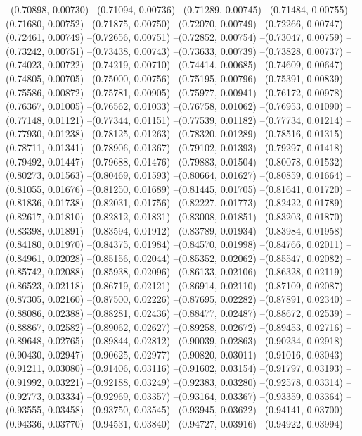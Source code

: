 --(0.70898, 0.00730)
--(0.71094, 0.00736)
--(0.71289, 0.00745)
--(0.71484, 0.00755)
--(0.71680, 0.00752)
--(0.71875, 0.00750)
--(0.72070, 0.00749)
--(0.72266, 0.00747)
--(0.72461, 0.00749)
--(0.72656, 0.00751)
--(0.72852, 0.00754)
--(0.73047, 0.00759)
--(0.73242, 0.00751)
--(0.73438, 0.00743)
--(0.73633, 0.00739)
--(0.73828, 0.00737)
--(0.74023, 0.00722)
--(0.74219, 0.00710)
--(0.74414, 0.00685)
--(0.74609, 0.00647)
--(0.74805, 0.00705)
--(0.75000, 0.00756)
--(0.75195, 0.00796)
--(0.75391, 0.00839)
--(0.75586, 0.00872)
--(0.75781, 0.00905)
--(0.75977, 0.00941)
--(0.76172, 0.00978)
--(0.76367, 0.01005)
--(0.76562, 0.01033)
--(0.76758, 0.01062)
--(0.76953, 0.01090)
--(0.77148, 0.01121)
--(0.77344, 0.01151)
--(0.77539, 0.01182)
--(0.77734, 0.01214)
--(0.77930, 0.01238)
--(0.78125, 0.01263)
--(0.78320, 0.01289)
--(0.78516, 0.01315)
--(0.78711, 0.01341)
--(0.78906, 0.01367)
--(0.79102, 0.01393)
--(0.79297, 0.01418)
--(0.79492, 0.01447)
--(0.79688, 0.01476)
--(0.79883, 0.01504)
--(0.80078, 0.01532)
--(0.80273, 0.01563)
--(0.80469, 0.01593)
--(0.80664, 0.01627)
--(0.80859, 0.01664)
--(0.81055, 0.01676)
--(0.81250, 0.01689)
--(0.81445, 0.01705)
--(0.81641, 0.01720)
--(0.81836, 0.01738)
--(0.82031, 0.01756)
--(0.82227, 0.01773)
--(0.82422, 0.01789)
--(0.82617, 0.01810)
--(0.82812, 0.01831)
--(0.83008, 0.01851)
--(0.83203, 0.01870)
--(0.83398, 0.01891)
--(0.83594, 0.01912)
--(0.83789, 0.01934)
--(0.83984, 0.01958)
--(0.84180, 0.01970)
--(0.84375, 0.01984)
--(0.84570, 0.01998)
--(0.84766, 0.02011)
--(0.84961, 0.02028)
--(0.85156, 0.02044)
--(0.85352, 0.02062)
--(0.85547, 0.02082)
--(0.85742, 0.02088)
--(0.85938, 0.02096)
--(0.86133, 0.02106)
--(0.86328, 0.02119)
--(0.86523, 0.02118)
--(0.86719, 0.02121)
--(0.86914, 0.02110)
--(0.87109, 0.02087)
--(0.87305, 0.02160)
--(0.87500, 0.02226)
--(0.87695, 0.02282)
--(0.87891, 0.02340)
--(0.88086, 0.02388)
--(0.88281, 0.02436)
--(0.88477, 0.02487)
--(0.88672, 0.02539)
--(0.88867, 0.02582)
--(0.89062, 0.02627)
--(0.89258, 0.02672)
--(0.89453, 0.02716)
--(0.89648, 0.02765)
--(0.89844, 0.02812)
--(0.90039, 0.02863)
--(0.90234, 0.02918)
--(0.90430, 0.02947)
--(0.90625, 0.02977)
--(0.90820, 0.03011)
--(0.91016, 0.03043)
--(0.91211, 0.03080)
--(0.91406, 0.03116)
--(0.91602, 0.03154)
--(0.91797, 0.03193)
--(0.91992, 0.03221)
--(0.92188, 0.03249)
--(0.92383, 0.03280)
--(0.92578, 0.03314)
--(0.92773, 0.03334)
--(0.92969, 0.03357)
--(0.93164, 0.03367)
--(0.93359, 0.03364)
--(0.93555, 0.03458)
--(0.93750, 0.03545)
--(0.93945, 0.03622)
--(0.94141, 0.03700)
--(0.94336, 0.03770)
--(0.94531, 0.03840)
--(0.94727, 0.03916)
--(0.94922, 0.03994)

